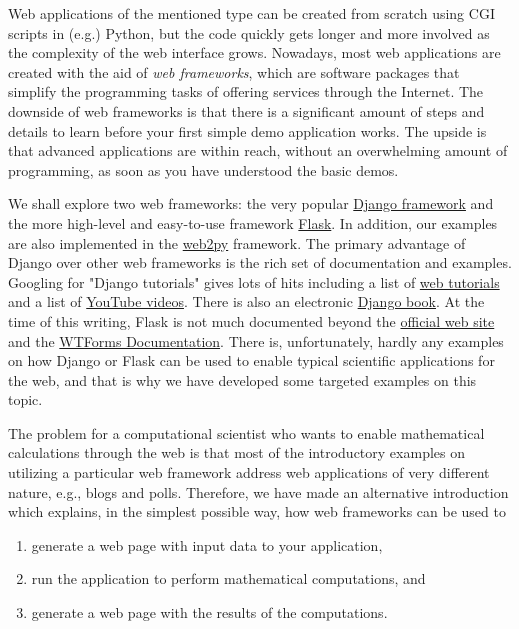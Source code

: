 \documentclass[%
oneside,                 %
final,                   %
10pt]{article}
\begin{document}
Web applications of the mentioned type can be created from scratch
using CGI scripts in (e.g.) Python, but the code quickly gets longer
and more involved as the complexity of the web interface
grows. Nowadays, most web applications are created with the aid of
\emph{web frameworks}, which are software packages that simplify the
programming tasks of offering services through the Internet. The
downside of web frameworks is that there is a significant amount of
steps and details to learn before your first simple demo application
works.  The upside is that advanced applications are within reach,
without an overwhelming amount of programming, as soon as you have
understood the basic demos.

We shall explore two web frameworks: the very popular \href{{https://www.djangoproject.com/}}{Django framework} and the more high-level and easy-to-use framework
\href{{http://flask.pocoo.org/}}{Flask}. In addition, our examples are also
implemented in the \href{{http://www.web2py.com/}}{web2py} framework.
The primary advantage of Django
over other web frameworks is the rich set of documentation and
examples. Googling for "Django tutorials" gives lots of hits including
a  list of \href{{https://code.djangoproject.com/wiki/Tutorials}}{web tutorials}
and a list of \href{{http://www.youtube.com/playlist?list=PL385A53B00B8B158E}}{YouTube videos}. There is also an electronic \href{{http://www.djangobook.com/en/2.0/}}{Django book}. At the time of this writing, Flask is not
much documented beyond the \href{{http://flask.pocoo.org/}}{official web site} and the \href{{http://wtforms.simplecodes.com/docs/0.6/index.html}}{WTForms Documentation}. There is, unfortunately, hardly any examples on how Django or Flask can be used to enable typical scientific applications for the web, and that is why we have developed some targeted examples on this topic.


The problem for a computational scientist who wants to enable
mathematical calculations through the web is that most of
the introductory examples on utilizing a particular
web framework address web applications
of very different nature, e.g., blogs and polls. Therefore, we have made an
alternative introduction which explains, in the simplest possible way,
how web frameworks can be used to

\begin{enumerate}
\item generate a web page with input data to your application,

\item run the application to perform mathematical computations, and

\item generate a web page with the results of the computations.
\end{enumerate}
\end{document}
